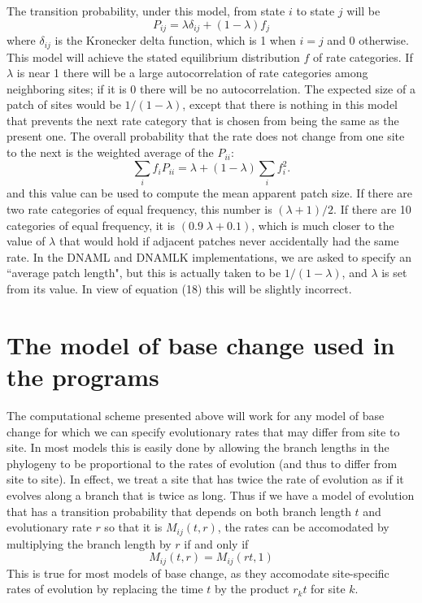 \documentclass[12pt]{article}
\begin{document}
The transition probability, under this model, from state $i$ to state $j$
will be
\begin{equation}%
P_{ij}  =  \lambda \delta_{ij} + (1 - \lambda) f_j
\end{equation}
where $\delta_{ij}$ is the Kronecker delta function, which is 1 when
$i = j$ and 0 otherwise.  This model will achieve the stated equilibrium
distribution $f$ of rate categories.  If $\lambda$ is near 1 there will
be a large autocorrelation of rate categories among neighboring sites; if
it is 0 there will be no autocorrelation.  The expected size of a patch of
sites would be $1/(1-\lambda)$, except that there is nothing in this model
that prevents the next rate category that is chosen from being the same as
the present one.  The overall probability that the rate does not change
from one site to the next is the weighted average of the $P_{ii}$:
\begin{equation}%
\sum_i f_i P_{ii}  =  \lambda  + (1 - \lambda) \sum_i f_i^2.
\end{equation}
and this value can be used to compute the mean apparent patch size.
If there are two rate categories of equal frequency, this number is
$(\lambda+1)/2$.  If there are 10 categories of equal frequency, it is
$(0.9\;\lambda+0.1)$, which is much closer to the value of $\lambda$ that
would hold if adjacent patches never accidentally had the same rate.
In the DNAML and DNAMLK implementations, we are asked to specify an
``average patch length", but this is actually taken to be $1/(1-\lambda)$, and $\lambda$ is
set from its value.  In view of equation (18) this will be slightly incorrect.

\section*{The model of base change used in the programs}

The computational scheme presented above will work for any model of
base change for which we can specify evolutionary rates that may differ from
site to site.  In most models this is easily done by allowing the
branch lengths in the phylogeny to be proportional to 
the rates of evolution (and thus to differ from site to site).  In effect,
we treat a site that has twice the rate of evolution as if it evolves
along a branch that is twice as long.  Thus if we have a model of evolution
that has a transition probability that depends on both branch length $t$
and evolutionary rate $r$ so that it is $M_{ij}(t, r)$, the rates can be
accomodated by multiplying the branch length by $r$ if and only if
\begin{equation}%
M_{ij}(t, r) = M_{ij}(rt, 1)
\end{equation}
This is true for most models of base change, as they accomodate site-specific
rates of evolution by replacing the time $t$ by the product $r_kt$ for site $k$.
\end{document}
